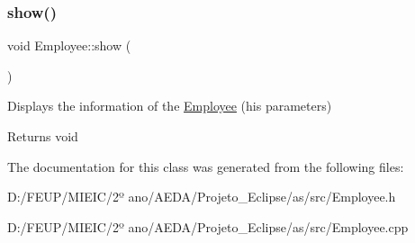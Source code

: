 \subsubsection{\texorpdfstring{show()}{show()}}
{\footnotesize\ttfamily void Employee\+::show (\begin{DoxyParamCaption}{ }\end{DoxyParamCaption})}



Displays the information of the \hyperlink{class_employee}{Employee} (his parameters) 

\begin{DoxyReturn}{Returns}
void 
\end{DoxyReturn}


The documentation for this class was generated from the following files\+:\begin{DoxyCompactItemize}
\item 
D\+:/\+F\+E\+U\+P/\+M\+I\+E\+I\+C/2º ano/\+A\+E\+D\+A/\+Projeto\+\_\+\+Eclipse/as/src/Employee.\+h\item 
D\+:/\+F\+E\+U\+P/\+M\+I\+E\+I\+C/2º ano/\+A\+E\+D\+A/\+Projeto\+\_\+\+Eclipse/as/src/Employee.\+cpp\end{DoxyCompactItemize}
